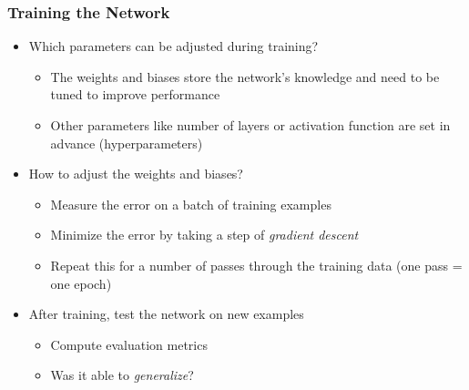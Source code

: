 \begin{frame}
  \frametitle{Training the Network}
  \begin{itemize}
    \item Which parameters can be adjusted during training?
      \begin{itemize}
        \item The weights and biases store the network's knowledge and
          need to be tuned to improve performance
        \item Other parameters like number of layers or activation
          function are set in advance (hyperparameters)
      \end{itemize}
    \item How to adjust the weights and biases?
      \begin{itemize}
        \item Measure the error on a batch of training examples
        \item Minimize the error by taking a step of \textit{gradient
          descent}
        \item Repeat this for a number of passes through the training
          data (one pass = one epoch)
      \end{itemize}
    \item After training, test the network on new examples
      \begin{itemize}
        \item Compute evaluation metrics
        \item Was it able to \textit{generalize}?
      \end{itemize}
  \end{itemize}
\end{frame}
